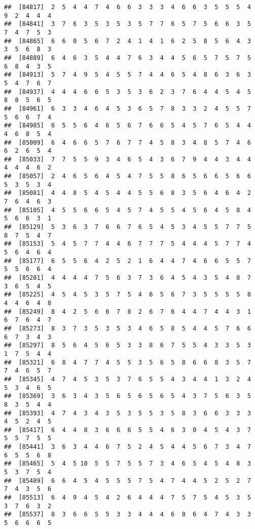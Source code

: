 \documentclass[
]{book}
\begin{document}
\begin{verbatim}
##  [84817]  2  5  4  4  7  4  6  6  3  3  3  4  6  6  3  5  5  5  4  9  2  4  4  4
##  [84841]  3  7  6  3  5  3  5  3  5  7  7  6  5  7  5  6  6  3  5  7  4  7  5  3
##  [84865]  6  6  0  5  6  7  2  4  1  4  1  6  2  5  8  5  6  4  3  3  5  6  8  3
##  [84889]  6  4  6  3  5  4  4  7  6  3  4  4  5  6  5  7  5  7  5  6  8  4  3  5
##  [84913]  5  7  4  9  5  4  5  5  7  4  4  6  5  4  8  6  3  6  3  5  4  7  6  7
##  [84937]  4  4  4  6  6  5  3  5  3  6  2  3  7  6  4  4  5  4  5  8  8  5  6  5
##  [84961]  6  3  3  4  6  4  5  3  6  5  7  8  3  3  2  4  5  5  7  5  6  6  7  4
##  [84985]  6  5  5  6  4  6  5  6  7  6  6  5  4  5  7  6  5  4  4  4  6  8  5  4
##  [85009]  6  4  6  6  5  7  6  7  7  4  5  8  3  4  8  5  7  4  6  6  2  6  5  4
##  [85033]  7  7  5  5  9  3  4  6  5  4  3  6  7  9  4  4  3  4  4  4  4  4  6  2
##  [85057]  2  4  6  5  6  4  5  4  7  5  5  8  6  5  6  6  5  6  6  5  3  5  3  4
##  [85081]  4  4  8  5  4  5  4  4  5  5  6  8  3  5  6  4  6  4  2  7  6  4  6  3
##  [85105]  4  5  5  6  6  5  4  5  7  4  5  5  4  5  6  4  5  8  4  5  6  6  3  1
##  [85129]  5  3  6  3  7  6  6  7  6  5  4  5  3  4  5  5  7  7  5  8  7  5  4  7
##  [85153]  5  4  5  7  7  4  4  6  7  7  7  5  4  4  4  5  7  7  4  5  6  4  6  4
##  [85177]  6  5  5  6  4  2  5  2  1  6  4  4  7  4  6  6  5  5  7  5  5  6  6  4
##  [85201]  4  4  4  4  7  5  6  3  7  3  6  4  5  4  3  5  4  8  7  3  6  5  4  5
##  [85225]  4  5  4  5  3  5  7  5  4  6  5  6  7  3  5  5  5  5  8  4  4  6  4  8
##  [85249]  8  4  2  5  6  6  7  8  2  6  7  6  4  4  7  4  4  3  1  6  7  6  4  7
##  [85273]  8  3  7  3  5  3  5  3  4  6  5  8  5  4  4  5  7  6  6  6  7  3  4  3
##  [85297]  8  5  6  4  5  6  5  3  3  8  6  7  5  5  4  3  3  5  3  1  7  5  4  4
##  [85321]  6  8  4  7  7  4  5  5  3  5  6  5  8  6  6  8  3  5  7  7  4  6  5  7
##  [85345]  4  7  4  5  3  5  3  7  6  5  5  4  3  4  4  1  3  2  4  5  3  4  6  5
##  [85369]  3  6  3  4  3  5  6  5  6  5  6  5  4  3  7  5  6  3  5  8  3  5  4  4
##  [85393]  4  7  4  3  4  3  5  3  5  5  3  5  8  3  6  6  3  3  3  4  5  2  4  5
##  [85417]  6  4  4  8  3  6  6  6  5  5  4  6  3  0  4  5  4  3  7  5  5  7  5  5
##  [85441]  3  6  3  4  4  6  7  5  2  4  5  4  4  5  6  7  3  4  7  6  5  5  6  8
##  [85465]  5  4  5 10  5  5  7  5  5  7  3  4  6  5  4  5  4  8  3  5  3  7  5  4
##  [85489]  6  6  4  5  4  5  5  5  7  5  4  7  4  4  5  2  5  2  7  7  4  3  5  6
##  [85513]  6  4  9  4  5  4  2  6  4  4  4  7  5  7  5  4  5  3  5  3  7  6  3  2
##  [85537]  8  3  6  6  5  5  3  3  4  4  4  6  8  6  4  7  4  3  3  5  6  6  6  5

\end{verbatim}
\end{document}
